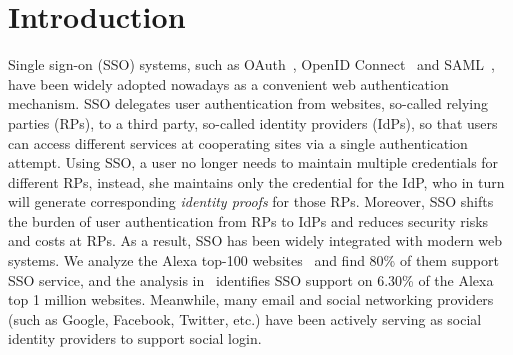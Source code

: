 \section{Introduction}
\label{sec:intro}

Single sign-on (SSO) systems, such as OAuth~\cite{rfc6749}, OpenID Connect~\cite{OpenIDConnect} and SAML~\cite{SAML}, have been widely adopted nowadays as a convenient web authentication mechanism. SSO delegates user authentication from websites, so-called relying parties (RPs), to a third party, so-called identity providers (IdPs), so that users can access different services at cooperating sites via a single authentication attempt. Using SSO, a user no longer needs to maintain multiple credentials for different RPs, instead, she maintains only the credential for the IdP, who in turn will generate corresponding \emph{identity proofs} for those RPs. Moreover, SSO shifts the burden of user authentication from RPs to IdPs and reduces security risks and costs at RPs. As a result, SSO has been widely integrated with modern web systems.
We analyze the Alexa top-100 websites~\cite{Alexa} and find 80\% of them support SSO service,
 and the analysis in~\cite{GhasemisharifRC18} identifies SSO support on 6.30\% of the Alexa top 1 million websites.
Meanwhile, many email and social networking providers (such as Google, Facebook, Twitter, etc.) have been actively serving as social identity providers to support social login.



